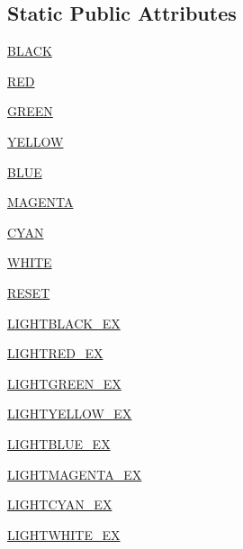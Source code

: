 \subsection*{Static Public Attributes}
\begin{DoxyCompactItemize}
\item 
\hyperlink{classpip_1_1__vendor_1_1colorama_1_1ansi_1_1AnsiBack_aa29cf60de8bbb88fdcf84630ee04d263}{B\+L\+A\+CK}
\item 
\hyperlink{classpip_1_1__vendor_1_1colorama_1_1ansi_1_1AnsiBack_a9bc3dc5aa8769a440bf55cc15e3127f7}{R\+ED}
\item 
\hyperlink{classpip_1_1__vendor_1_1colorama_1_1ansi_1_1AnsiBack_ac24002793868b2b72bb538814c8625db}{G\+R\+E\+EN}
\item 
\hyperlink{classpip_1_1__vendor_1_1colorama_1_1ansi_1_1AnsiBack_acfb196566c88cb0f154633768225bfa0}{Y\+E\+L\+L\+OW}
\item 
\hyperlink{classpip_1_1__vendor_1_1colorama_1_1ansi_1_1AnsiBack_a772a73a0bf928b2d7fc442ad5774d8bb}{B\+L\+UE}
\item 
\hyperlink{classpip_1_1__vendor_1_1colorama_1_1ansi_1_1AnsiBack_a43189dd7b7401c70dcfdcd9584ee04dd}{M\+A\+G\+E\+N\+TA}
\item 
\hyperlink{classpip_1_1__vendor_1_1colorama_1_1ansi_1_1AnsiBack_a37a5fa03040ab6b29911fe357e1dd138}{C\+Y\+AN}
\item 
\hyperlink{classpip_1_1__vendor_1_1colorama_1_1ansi_1_1AnsiBack_a843edaf2e541ec4099d8e8568aba7e22}{W\+H\+I\+TE}
\item 
\hyperlink{classpip_1_1__vendor_1_1colorama_1_1ansi_1_1AnsiBack_a563a4212e98c8267703598f080f66507}{R\+E\+S\+ET}
\item 
\hyperlink{classpip_1_1__vendor_1_1colorama_1_1ansi_1_1AnsiBack_ade3c0d67ecde47c86fb40cdda8aa4145}{L\+I\+G\+H\+T\+B\+L\+A\+C\+K\+\_\+\+EX}
\item 
\hyperlink{classpip_1_1__vendor_1_1colorama_1_1ansi_1_1AnsiBack_a48b863d84997292ebc18d6b45479b3f5}{L\+I\+G\+H\+T\+R\+E\+D\+\_\+\+EX}
\item 
\hyperlink{classpip_1_1__vendor_1_1colorama_1_1ansi_1_1AnsiBack_a90fd5dd8dbb693744c2982ef17b020de}{L\+I\+G\+H\+T\+G\+R\+E\+E\+N\+\_\+\+EX}
\item 
\hyperlink{classpip_1_1__vendor_1_1colorama_1_1ansi_1_1AnsiBack_a5681267ecc11829581fc10ac38190e49}{L\+I\+G\+H\+T\+Y\+E\+L\+L\+O\+W\+\_\+\+EX}
\item 
\hyperlink{classpip_1_1__vendor_1_1colorama_1_1ansi_1_1AnsiBack_a6f906eae3272f69992599b60a7e84a14}{L\+I\+G\+H\+T\+B\+L\+U\+E\+\_\+\+EX}
\item 
\hyperlink{classpip_1_1__vendor_1_1colorama_1_1ansi_1_1AnsiBack_a269bd0c932525ced5bc81991737ae648}{L\+I\+G\+H\+T\+M\+A\+G\+E\+N\+T\+A\+\_\+\+EX}
\item 
\hyperlink{classpip_1_1__vendor_1_1colorama_1_1ansi_1_1AnsiBack_a3220c6e2e10903f11dcea1b8257f24cd}{L\+I\+G\+H\+T\+C\+Y\+A\+N\+\_\+\+EX}
\item 
\hyperlink{classpip_1_1__vendor_1_1colorama_1_1ansi_1_1AnsiBack_a10ee10fe5ae7479a9f7f8944f6507a11}{L\+I\+G\+H\+T\+W\+H\+I\+T\+E\+\_\+\+EX}
\end{DoxyCompactItemize}

